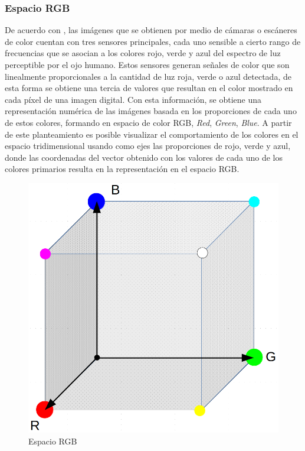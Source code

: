 \subsubsection{Espacio RGB}
De acuerdo con \cite{pratt_introduction_2014}, las imágenes que se obtienen por medio de cámaras o escáneres de color cuentan con tres sensores principales, cada uno sensible a cierto rango de frecuencias que se asocian a los colores rojo, verde y azul del espectro de luz perceptible por el ojo humano. Estos sensores generan señales de color que son linealmente proporcionales a la cantidad de luz roja, verde o azul  detectada, de esta forma se obtiene una tercia de valores que resultan en el color mostrado en cada píxel de una imagen digital. Con esta información, se obtiene una representación numérica de las imágenes basada en los proporciones de cada uno de estos colores, formando en espacio de color RGB, \textit{Red}, \textit{Green}, \textit{Blue}. A partir de este planteamiento es posible visualizar el comportamiento de los colores en el espacio tridimensional usando como ejes las proporciones de rojo, verde y azul, donde las coordenadas del vector obtenido con los valores de cada uno de los colores primarios resulta en la representación en el espacio RGB.

\begin{figure}[H]
\centering
\includegraphics[scale=0.18]{Figures/CuboRGB.png}
    \caption{Espacio RGB}
    \label{fig:RGB_Space}
\end{figure}

